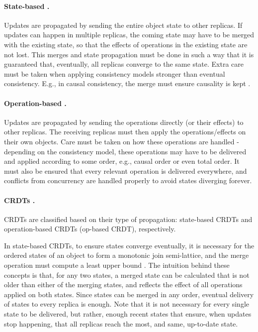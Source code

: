 
\paragraph{State-based \cite{crdt}.} Updates are propagated by sending the entire object state to other replicas.
If updates can happen in multiple replicas, the coming state may have to be merged with the existing state, so that the effects of operations in the existing state are not lost.
This merges and state propagation must be done in such a way that it is guaranteed that, eventually, all replicas converge to the same state.
Extra care must be taken when applying consistency models stronger than eventual consistency.
E.g., in causal consistency, the merge must ensure causality is kept \cite{understandingEC}.

\paragraph{Operation-based \cite{crdt}.}
Updates are propagated by sending the operations directly (or their effects) to other replicas.
The receiving replicas must then apply the operations/effects on their own objects.
Care must be taken on how these operations are handled - depending on the consistency model, these operations may have to be delivered and applied according to some order, e.g., causal order or even total order.
It must also be ensured that every relevant operation is delivered everywhere, and conflicts from concurrency are handled properly to avoid states diverging forever.

\paragraph{CRDTs \cite{15}.}
CRDTs are classified based on their type of propagation: state-based CRDTs and operation-based CRDTs (op-based CRDT), respectively.

In state-based CRDTs, to ensure states converge eventually, it is necessary for the ordered states of an object to form a monotonic join semi-lattice, and the merge operation must compute a least upper bound \cite{crdt, stateCRDT}. The intuition behind these concepts is that, for any two states, a merged state can be calculated that is not older than either of the merging states, and reflects the effect of all operations applied on both states.
Since states can be merged in any order, eventual delivery of states to every replica is enough.
Note that it is not necessary for every single state to be delivered, but rather, enough recent states that ensure, when updates stop happening, that all replicas reach the most, and same, up-to-date state.

